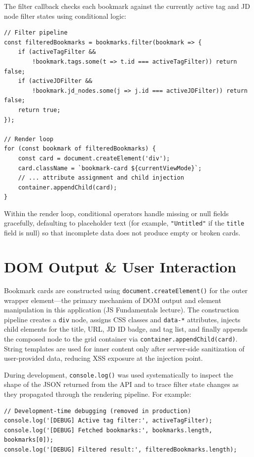 \documentclass[11pt,a4paper]{book}
\begin{document}
The filter callback checks each bookmark against the currently active tag and JD node filter states using conditional logic:

\begin{verbatim}
// Filter pipeline
const filteredBookmarks = bookmarks.filter(bookmark => {
    if (activeTagFilter &&
        !bookmark.tags.some(t => t.id === activeTagFilter)) return false;
    if (activeJDFilter &&
        !bookmark.jd_nodes.some(j => j.id === activeJDFilter)) return false;
    return true;
});

// Render loop
for (const bookmark of filteredBookmarks) {
    const card = document.createElement('div');
    card.className = `bookmark-card ${currentViewMode}`;
    // ... attribute assignment and child injection
    container.appendChild(card);
}
\end{verbatim}

Within the render loop, conditional operators handle missing or null fields gracefully, defaulting to placeholder text (for example, \texttt{"Untitled"} if the \texttt{title} field is null) so that incomplete data does not produce empty or broken cards.

\section{DOM Output \& User Interaction}

Bookmark cards are constructed using \texttt{document.createElement()} for the outer wrapper element---the primary mechanism of DOM output and element manipulation in this application (JS Fundamentals lecture). The construction pipeline creates a \texttt{div} node, assigns CSS classes and \texttt{data-*} attributes, injects child elements for the title, URL, JD ID badge, and tag list, and finally appends the composed node to the grid container via \texttt{container.appendChild(card)}. String templates are used for inner content only after server-side sanitization of user-provided data, reducing XSS exposure at the injection point.

During development, \texttt{console.log()} was used systematically to inspect the shape of the JSON returned from the API and to trace filter state changes as they propagated through the rendering pipeline. For example:

\begin{verbatim}
// Development-time debugging (removed in production)
console.log('[DEBUG] Active tag filter:', activeTagFilter);
console.log('[DEBUG] Fetched bookmarks:', bookmarks.length, bookmarks[0]);
console.log('[DEBUG] Filtered result:', filteredBookmarks.length);
\end{verbatim}
\end{document}
